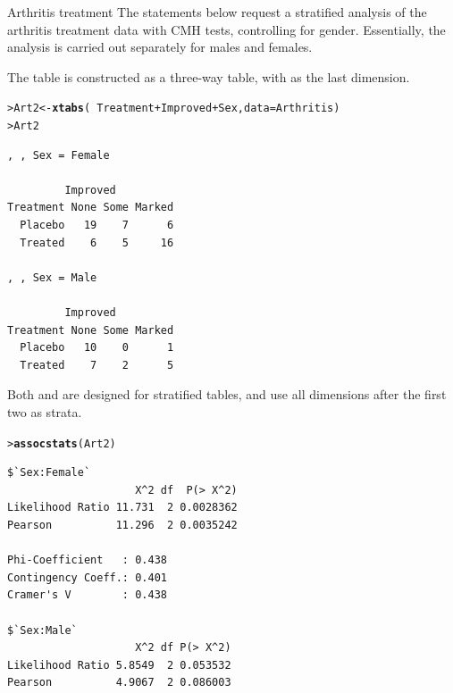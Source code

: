 \documentclass[10pt,krantz2]{krantz}\usepackage[]{graphicx}\usepackage[]{color}
\makeatletter
\newcommand{\hlopt}[1]{\textcolor[rgb]{0,0,0}{#1}}%
\newcommand{\hlstd}[1]{\textcolor[rgb]{0.345,0.345,0.345}{#1}}%
\newcommand{\hlkwb}[1]{\textcolor[rgb]{0.69,0.353,0.396}{#1}}%
\newcommand{\hlkwc}[1]{\textcolor[rgb]{0.333,0.667,0.333}{#1}}%
\newcommand{\hlkwd}[1]{\textcolor[rgb]{0.737,0.353,0.396}{\textbf{#1}}}%
\newenvironment{kframe}{%
 \def\at@end@of@kframe{}%
 \ifinner\ifhmode%
  \def\at@end@of@kframe{\end{minipage}}%
  \begin{minipage}{\columnwidth}%
 \fi\fi%
 \def\FrameCommand##1{\hskip\@totalleftmargin \hskip-\fboxsep
 \colorbox{shadecolor}{##1}\hskip-\fboxsep
     \hskip-\linewidth \hskip-\@totalleftmargin \hskip\columnwidth}%
 \MakeFramed {\advance\hsize-\width
   \@totalleftmargin\z@ \linewidth\hsize
   \@setminipage}}%
 {\par\unskip\endMakeFramed%
 \at@end@of@kframe}
\newenvironment{knitrout}{}{} %
\renewenvironment{knitrout}{\small\renewcommand{\baselinestretch}{.85}}{} %
\makeatother
\begin{document}
\begin{Example}[arthrit3]{Arthritis treatment}
The statements below request a stratified analysis of the arthritis
treatment data
with CMH tests,
controlling for gender.  Essentially, the analysis is carried out
separately for males and females.

The table  is constructed as a three-way table,
with  as the last dimension.
\begin{knitrout}
\color{fgcolor}\begin{kframe}
\begin{alltt}
\hlstd{> }\hlstd{Art2} \hlkwb{<-} \hlkwd{xtabs}\hlstd{(}\hlopt{~} \hlstd{Treatment} \hlopt{+} \hlstd{Improved} \hlopt{+} \hlstd{Sex,} \hlkwc{data} \hlstd{= Arthritis)}
\hlstd{> }\hlstd{Art2}
\end{alltt}
\begin{verbatim}
, , Sex = Female

         Improved
Treatment None Some Marked
  Placebo   19    7      6
  Treated    6    5     16

, , Sex = Male

         Improved
Treatment None Some Marked
  Placebo   10    0      1
  Treated    7    2      5
\end{verbatim}
\end{kframe}
\end{knitrout}
Both  and  are 
designed for stratified tables, and
use all dimensions after the first two as strata.
\begin{knitrout}
\color{fgcolor}\begin{kframe}
\begin{alltt}
\hlstd{> }\hlkwd{assocstats}\hlstd{(Art2)}
\end{alltt}
\begin{verbatim}
$`Sex:Female`
                    X^2 df  P(> X^2)
Likelihood Ratio 11.731  2 0.0028362
Pearson          11.296  2 0.0035242

Phi-Coefficient   : 0.438 
Contingency Coeff.: 0.401 
Cramer's V        : 0.438 

$`Sex:Male`
                    X^2 df P(> X^2)
Likelihood Ratio 5.8549  2 0.053532
Pearson          4.9067  2 0.086003


\end{verbatim}
\end{kframe}
\end{knitrout}
\end{Example}
\end{document}
